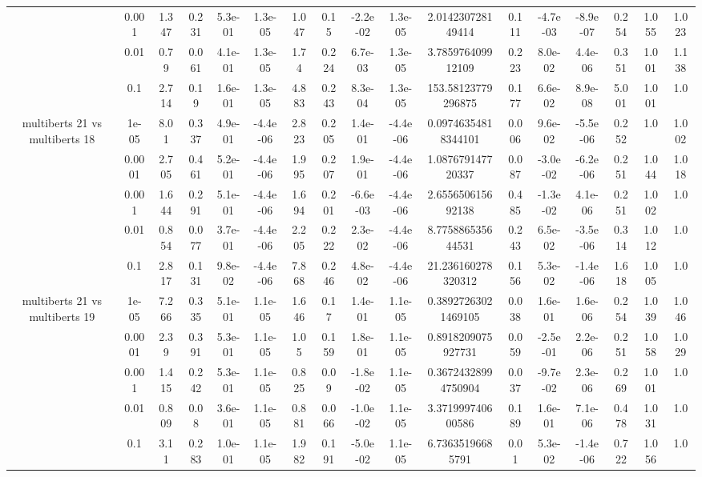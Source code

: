 \begin{tabular}{|c|c|c|c|c|c|c|c|c|c|c|c|c|c|c|c|c|}
 & 0.001 & 1.347 & 0.231 & 5.3e-01 & 1.3e-05 & 1.047 & 0.15 & -2.2e-02 & 1.3e-05 & 2.014230728149414 & 0.111 & -4.7e-03 & -8.9e-07 & 0.254 & 1.055 & 1.023 \\
 & 0.01 & 0.79 & 0.061 & 4.1e-01 & 1.3e-05 & 1.74 & 0.224 & 6.7e-03 & 1.3e-05 & 3.785976409912109 & 0.223 & 8.0e-02 & 4.4e-06 & 0.351 & 1.001 & 1.138 \\
 & 0.1 & 2.714 & 0.19 & 1.6e-01 & 1.3e-05 & 4.883 & 0.243 & 8.3e-04 & 1.3e-05 & 153.58123779296875 & 0.177 & 6.6e-02 & 8.9e-08 & 5.001 & 1.001 & 1.0 \\
\hline
\multirow{5}{*}{multiberts 21 vs multiberts 18} & 1e-05 & 8.01 & 0.337 & 4.9e-01 & -4.4e-06 & 2.823 & 0.205 & 1.4e-01 & -4.4e-06 & 0.09746354818344101 & 0.006 & 9.6e-02 & -5.5e-06 & 0.252 & 1.0 & 1.002 \\
 & 0.0001 & 2.705 & 0.461 & 5.2e-01 & -4.4e-06 & 1.995 & 0.207 & 1.9e-01 & -4.4e-06 & 1.087679147720337 & 0.087 & -3.0e-02 & -6.2e-06 & 0.251 & 1.044 & 1.018 \\
 & 0.001 & 1.644 & 0.291 & 5.1e-01 & -4.4e-06 & 1.694 & 0.201 & -6.6e-03 & -4.4e-06 & 2.655650615692138 & 0.485 & -1.3e-02 & 4.1e-06 & 0.251 & 1.002 & 1.0 \\
 & 0.01 & 0.854 & 0.077 & 3.7e-01 & -4.4e-06 & 2.205 & 0.222 & 2.3e-02 & -4.4e-06 & 8.775886535644531 & 0.243 & 6.5e-02 & -3.5e-06 & 0.314 & 1.012 & 1.0 \\
 & 0.1 & 2.817 & 0.131 & 9.8e-02 & -4.4e-06 & 7.868 & 0.246 & 4.8e-02 & -4.4e-06 & 21.236160278320312 & 0.156 & 5.3e-02 & -1.4e-06 & 1.618 & 1.005 & 1.0 \\
\hline
\multirow{5}{*}{multiberts 21 vs multiberts 19} & 1e-05 & 7.266 & 0.335 & 5.1e-01 & 1.1e-05 & 1.646 & 0.17 & 1.4e-01 & 1.1e-05 & 0.38927263021469105 & 0.038 & 1.6e-01 & 1.6e-06 & 0.254 & 1.039 & 1.046 \\
 & 0.0001 & 2.39 & 0.391 & 5.3e-01 & 1.1e-05 & 1.05 & 0.159 & 1.8e-01 & 1.1e-05 & 0.8918209075927731 & 0.059 & -2.5e-01 & 2.2e-06 & 0.251 & 1.058 & 1.029 \\
 & 0.001 & 1.415 & 0.242 & 5.3e-01 & 1.1e-05 & 0.825 & 0.09 & -1.8e-02 & 1.1e-05 & 0.36724328994750904 & 0.037 & -9.7e-02 & 2.3e-06 & 0.269 & 1.001 & 1.0 \\
 & 0.01 & 0.809 & 0.08 & 3.6e-01 & 1.1e-05 & 0.881 & 0.066 & -1.0e-02 & 1.1e-05 & 3.371999740600586 & 0.189 & 1.6e-01 & 7.1e-06 & 0.478 & 1.031 & 1.0 \\
 & 0.1 & 3.11 & 0.283 & 1.0e-01 & 1.1e-05 & 1.982 & 0.191 & -5.0e-02 & 1.1e-05 & 6.73635196685791 & 0.01 & 5.3e-02 & -1.4e-06 & 0.722 & 1.056 & 1.0 \\

\end{tabular}
